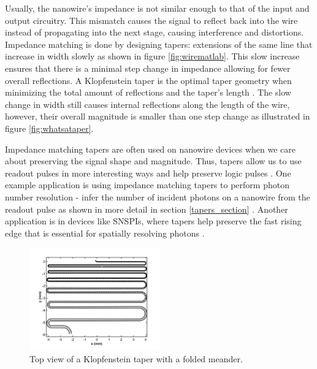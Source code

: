 Usually, the nanowire's impedance is not similar enough to that of the input and output circuitry. This mismatch causes the signal to reflect back into the wire instead 
of propagating into the next stage, causing interference and distortions. Impedance 
matching is done by designing tapers: extensions of the same line that increase in 
width slowly as shown in figure \ref{fig:wirematlab}. This slow increase ensures 
that there is a minimal step change in impedance allowing for fewer overall reflections. A Klopfenstein taper is the optimal taper geometry when minimizing the total amount 
of reflections and the taper's length \cite{klopfenstein_transmission_1956}. 
The slow change in width still causes internal reflections along the length of the 
wire, however, their overall magnitude is smaller than one step change as illustrated in 
figure \ref{fig:whatsataper}.

Impedance matching tapers are often used on nanowire devices when we care about preserving
the signal shape and magnitude. Thus, tapers allow us to use readout 
pulses in more
interesting ways and help preserve logic pulses \cite{snspi_paper, snspd-tapers-paper, maximizing_ic_w_taper}. 
One example application is using impedance matching tapers to
perform photon number resolution - infer the number of incident photons on a nanowire
from the readout pulse as shown in more detail in section \ref{tapers_section} \cite{pnr} .
Another application is in devices like SNSPIs, where tapers help preserve the fast rising edge that is essential for spatially
resolving photons \cite{snspi_paper}. 

\begin{figure}[h]
    \centering
\includegraphics[width=0.5\textwidth]{figs/wire_matlab.png}
    \caption{Top view of a Klopfenstein taper with a folded meander.}
    \label{fig:thewiredesign}
\end{figure}

